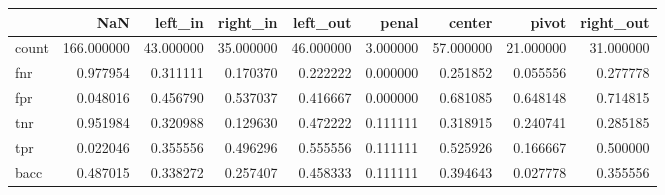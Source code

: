 \begin{tabular}{lrrrrrrrr}
\toprule
{} &         NaN &    left\_in &   right\_in &   left\_out &     penal &     center &      pivot &  right\_out \\
\midrule
count &  166.000000 &  43.000000 &  35.000000 &  46.000000 &  3.000000 &  57.000000 &  21.000000 &  31.000000 \\
fnr   &    0.977954 &   0.311111 &   0.170370 &   0.222222 &  0.000000 &   0.251852 &   0.055556 &   0.277778 \\
fpr   &    0.048016 &   0.456790 &   0.537037 &   0.416667 &  0.000000 &   0.681085 &   0.648148 &   0.714815 \\
tnr   &    0.951984 &   0.320988 &   0.129630 &   0.472222 &  0.111111 &   0.318915 &   0.240741 &   0.285185 \\
tpr   &    0.022046 &   0.355556 &   0.496296 &   0.555556 &  0.111111 &   0.525926 &   0.166667 &   0.500000 \\
bacc  &    0.487015 &   0.338272 &   0.257407 &   0.458333 &  0.111111 &   0.394643 &   0.027778 &   0.355556 \\
\bottomrule
\end{tabular}
